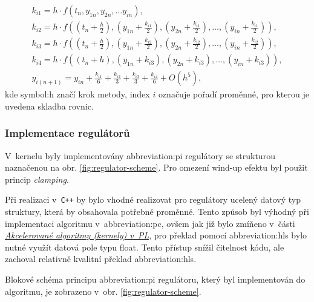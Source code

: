 \documentclass[a4paper, twoside, 11pt]{article}
\begin{document}
		\begin{equation}\label{eq:rk4-algoritmus-math-eq-in-kernel}
			\begin{gathered}
				k_{i 1} = h \cdot f(t_{n}, y_{1{n}}, y_{2{n}},\dots y_{{in}}),\\
				k_{i 2} = h \cdot f((t_{n}+\frac{h}{2}), (y_{1{n}} + \frac{k_{i 1}}{2}),(y_{2{n}}+ \frac{k_{i 1}}{2}),\dots , (y_{{in}}+\frac{k_{i 1}}{2})),\\
				k_{i 3} = h \cdot f((t_{n}+\frac{h}{2}), (y_{1{n}} + \frac{k_{i 2}}{2}), (y_{2{n}}+ \frac{k_{i 2}}{2}),\dots , (y_{{in}}+\frac{k_{i 2}}{2})),\\
				k_{i 4} = h \cdot f((t_{n}+h), (y_{1{n}} + k_{i 3}), (y_{2{n}}+ k_{i 3}),\dots , (y_{{in}}+k_{i 3})),\\
				y_{i(n+1)} = y_{i n} + \frac{k_{i 1}}{6} + \frac{k_{i 2}}{3} + \frac{k_{i 3}}{3} + \frac{k_{i 4}}{6} + O(h^{5}),
			\end{gathered}
		\end{equation}
		kde \gls{symbol:h} značí krok metody, index $i$ označuje pořadí proměnné, pro kterou je uvedena skladba rovnic.\par

		\subsubsection{Implementace regulátorů}
			V~kernelu byly implementovány \gls{abbreviation:pi} regulátory se strukturou naznačenou na obr. \ref{fig:regulator-scheme}. Pro omezení wind-up efektu byl použit princip \textit{clamping}.\par
			Při realizaci v~\texttt{C++} by bylo vhodné realizovat pro regulátory ucelený datový typ struktury, která by obsahovala potřebné proměnné. Tento způsob byl výhodný při implementaci algoritmu v~\gls{abbreviation:pc}, ovšem jak již bylo zmíňeno v~části \hyperref[subsec:akcelerovane-algoritmy-kernely-v-pl]{\textit{Akcelerované algoritmy (kernely) v~PL}}, pro překlad pomocí \gls{abbreviation:hls} bylo nutné využít datová pole typu float. Tento přístup snížil čitelnost kódu, ale zachoval relativně kvalitní překlad \gls{abbreviation:hls}.\par
			Blokové schéma principu \gls{abbreviation:pi} regulátoru, který byl implementován do algoritmu, je zobrazeno v~obr. \ref{fig:regulator-scheme}.\par
			
\end{document}
